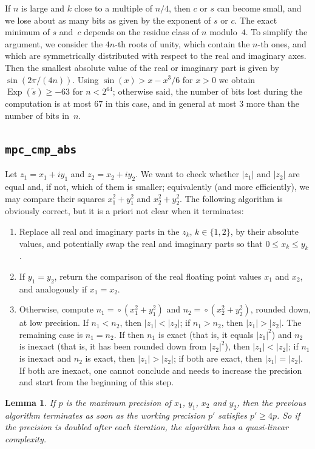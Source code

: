\documentclass [11pt]{article}
\newcommand {\appro}[1]{\widetilde {#1}}
\DeclareMathOperator{\Exp}{\operatorname {Exp}}
\newcommand {\round}{\operatorname {\circ}}
\renewcommand {\leq}{\leqslant}
\renewcommand {\geq}{\geqslant}
\newtheorem{lemma}[theorem]{Lemma}
\begin{document}
If $n$ is large and $k$ close to a multiple of $n/4$, then $c$ or $s$
can become small, and we lose about as many bits as given by the exponent
of $s$ or $c$. The exact minimum of $s$ and~$c$ depends on the residue
class of $n$ modulo~$4$. To simplify the argument, we consider the $4 n$-th
roots of unity, which contain the $n$-th ones, and which are symmetrically
distributed with respect to the real and imaginary axes. Then the smallest
absolute value of the real or imaginary part is given by
$\sin (2 \pi / (4 n))$. Using $\sin (x) > x - x^3 / 6$ for $x > 0$
we obtain $\Exp (\appro {s}) \geq -63$ for $n < 2^{64}$; otherwise said,
the number of bits lost during the computation is at most $67$ in this
case, and in general at most $3$ more than the number of bits in~$n$.


\subsection {\texttt {mpc\_cmp\_abs}}

Let $z_1 = x_1 + i y_1$ and $z_2 = x_2 + i y_2$. We want to check whether
$|z_1|$ and $|z_2|$ are equal and, if not, which of them
is smaller; equivalently (and more efficiently), we may compare their squares
$x_1^2 + y_1^2$ and $x_2^2 + y_2^2$.
The following algorithm is obviously correct, but it is a priori not clear
when it terminates:
\begin {enumerate}
\item
Replace all real and imaginary parts in the $z_k$, $k \in \{ 1, 2 \}$, by their
absolute values, and potentially swap the real and imaginary parts so that
$0 \leq x_k \leq y_k$.
\item
If $y_1 = y_2$, return the comparison of the real floating point values
$x_1$ and $x_2$, and analogously if $x_1 = x_2$.
\item
Otherwise, compute $n_1 = \round (x_1^2 + y_1^2)$ and
$n_2 = \round (x_2^2 + y_2^2)$, rounded down, at low precision.
If $n_1 < n_2$, then $|z_1| < |z_2|$;
if $n_1 > n_2$, then $|z_1| > |z_2|$.
The remaining case is $n_1 = n_2$.
If then $n_1$ is exact (that is, it equals $|z_1|^2$) and $n_2$ is inexact
(that is, it has been rounded down from $|z_2|^2$), then $|z_1| < |z_2|$;
if $n_1$ is inexact and $n_2$ is exact, then $|z_1| > |z_2|$;
if both are exact, then $|z_1| = |z_2|$.
If both are inexact, one cannot conclude and needs to increase the precision
and start from the beginning of this step.
\end {enumerate}

\begin {lemma}
If $p$ is the maximum precision of $x_1$, $y_1$, $x_2$ and $y_2$, then the
previous algorithm terminates as soon as the working precision $p'$ satisfies
$p' \geq 4p$.
So if the precision is doubled after each iteration, the algorithm has a
quasi-linear complexity.
\end {lemma}
\end{document}
